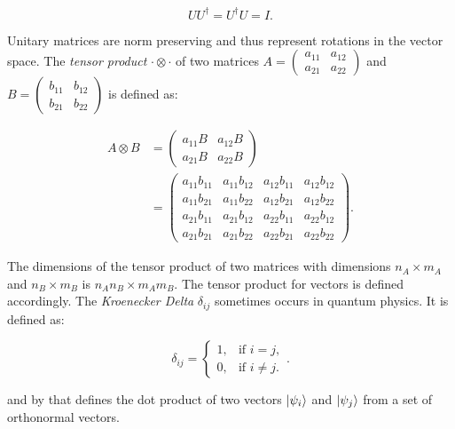 \begin{equation}
   U U^{\dagger} = U^{\dagger}U = I.
\end{equation}

Unitary matrices are norm preserving and thus represent rotations in the vector space.
The \textit{tensor product} $\cdot \otimes \cdot$ of two matrices $A=\begin{pmatrix}
   a_{11} & a_{12} \\ a_{21} & a_{22}
\end{pmatrix}$ and $B= \begin{pmatrix}
   b_{11} & b_{12} \\ b_{21} & b_22
\end{pmatrix}$ is defined as:

\begin{align}
   A \otimes B &= \begin{pmatrix}
      a_{11} B & a_{12} B \\ a_{21} B & a_{22} B
   \end{pmatrix} \\
   &= \begin{pmatrix}
      a_{11} b_{11} & a_{11} b_{12} & a_{12} b_{11} & a_{12} b_{12} \\
      a_{11} b_{21} & a_{11} b_{22} & a_{12} b_{21} & a_{12} b_{22} \\ 
      a_{21} b_{11} & a_{21} b_{12} & a_{22} b_{11} & a_{22} b_{12} \\
      a_{21} b_{21} & a_{21} b_{22} & a_{22} b_{21} & a_{22} b_{22}
   \end{pmatrix}.
\end{align}

The dimensions of the tensor product of two matrices with dimensions $n_A \times m_A$ and $n_B \times m_B$ 
is $n_An_B \times m_Am_B$. The tensor product for vectors is defined accordingly.
The \textit{Kroenecker Delta} $\delta_{ij}$ sometimes occurs in quantum physics. It is defined as:

\begin{equation}
   \delta_{ij} =
    \begin{cases}
            1, &         \text{if } i=j,\\
            0, &         \text{if } i\neq j.
    \end{cases}.
\end{equation}

and by that defines the dot product of two vectors $\Ket{\psi_i}$ and $\Ket{\psi_j}$ from 
a set of orthonormal vectors.



